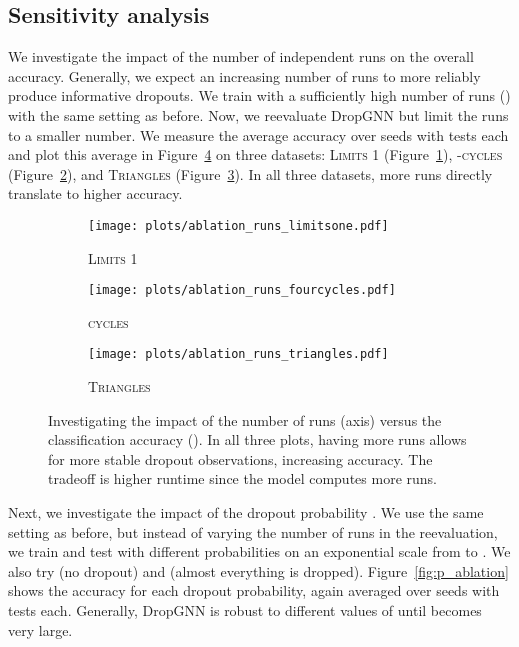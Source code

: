 \documentclass{article}
\begin{document}
\subsection{Sensitivity analysis}
We investigate the impact of the number of independent runs on the overall accuracy. Generally, we expect an increasing number of runs to more reliably produce informative dropouts. We train with a sufficiently high number of runs () with the same setting as before. Now, we reevaluate DropGNN but limit the runs to a smaller number. We measure the average accuracy over  seeds with  tests each and plot this average in Figure~\ref{fig:run_ablation} on three datasets: \textsc{Limits 1} (Figure~\ref{fig:run_ablation_limitsone}), \textsc{-cycles} (Figure~\ref{fig:run_ablation_4cycles}), and \textsc{Triangles} (Figure~\ref{fig:run_ablation_triangles}). In all three datasets, more runs directly translate to higher accuracy.

\begin{figure}
\begin{subfigure}{0.3\textwidth}
    \centering
    \texttt{[image: plots/ablation\_runs\_limitsone.pdf]}
    \caption{\textsc{Limits 1}}
    \label{fig:run_ablation_limitsone}
\end{subfigure}\hfill
\begin{subfigure}{0.3\textwidth}
    \centering
    \texttt{[image: plots/ablation\_runs\_fourcycles.pdf]}
    \caption{\textsc{cycles}}
    \label{fig:run_ablation_4cycles}
\end{subfigure}\hfill
\begin{subfigure}{0.3\textwidth}
    \centering
    \texttt{[image: plots/ablation\_runs\_triangles.pdf]}
    \caption{\textsc{Triangles}}
    \label{fig:run_ablation_triangles}
\end{subfigure}
    \caption{Investigating the impact of the number of runs (axis) versus the classification accuracy (). In all three plots, having more runs allows for more stable dropout observations, increasing accuracy. The tradeoff is higher runtime since the model computes more runs.}
    \label{fig:run_ablation}
\end{figure}

Next, we investigate the impact of the dropout probability . We use the same setting as before, but instead of varying the number of runs in the reevaluation, we train and test with different probabilities  on an exponential scale from  to . We also try  (no dropout) and  (almost everything is dropped). Figure~\ref{fig:p_ablation} shows the accuracy for each dropout probability, again averaged over  seeds with  tests each. Generally, DropGNN is robust to different values of  until  becomes very large.
\end{document}
